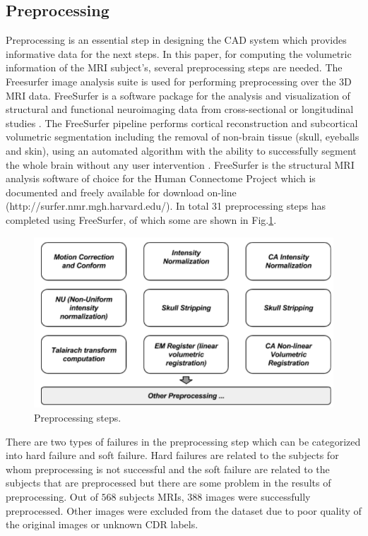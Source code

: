 \documentclass[runningheads,a4paper]{llncs}
\begin{document}
\subsection{Preprocessing}
Preprocessing is an essential step in designing the CAD system which provides informative data for the next steps. In this paper, for computing the volumetric information of the MRI subject’s, several preprocessing steps are needed. The Freesurfer image analysis suite is used for performing preprocessing over the 3D MRI data. FreeSurfer is a software package for the analysis and visualization of structural and functional neuroimaging data from cross-sectional or longitudinal studies \cite{16}. The FreeSurfer pipeline performs cortical reconstruction and subcortical volumetric segmentation including the removal of non-brain tissue (skull, eyeballs and skin), using an automated algorithm with the ability to successfully segment the whole brain without any user intervention \cite{f}. FreeSurfer is the structural MRI analysis software of choice for the Human Connectome Project which is documented and freely available for download on-line (http://surfer.nmr.mgh.harvard.edu/). In total 31 preprocessing steps has completed using FreeSurfer, of which some are shown in Fig.\ref{fig:prepsteps}.
\begin{figure}
\centering
\includegraphics[scale=0.4]{Preprocessing.png}
\caption{Preprocessing steps.}
\label{fig:prepsteps}
\end{figure}

There are two types of failures in the preprocessing step which can be categorized into hard failure and soft failure. Hard failures are related to the subjects for whom preprocessing is not successful and the soft failure are related to the subjects that are preprocessed but there are some problem in the results of preprocessing. Out of $568$ subjects MRIs, $388$ images were successfully preprocessed. Other images were excluded from
the dataset due to poor quality of the original images
or unknown CDR labels.
\end{document}
